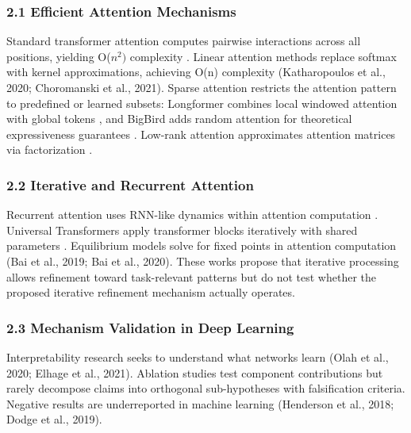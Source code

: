 
\subsubsection{2.1 Efficient Attention Mechanisms}

Standard transformer attention computes pairwise interactions across all positions, yielding O($n^{2})$ complexity \citep{vaswani2017attention}. Linear attention methods replace softmax with kernel approximations, achieving O(n) complexity (Katharopoulos et al., 2020; Choromanski et al., 2021). Sparse attention restricts the attention pattern to predefined or learned subsets: Longformer combines local windowed attention with global tokens \citep{beltagy2020longformer}, and BigBird adds random attention for theoretical expressiveness guarantees \citep{zaheer2020big}. Low-rank attention approximates attention matrices via factorization \citep{wang2020linformer}.

\subsubsection{2.2 Iterative and Recurrent Attention}

Recurrent attention uses RNN-like dynamics within attention computation \citep{graves2016adaptive}. Universal Transformers apply transformer blocks iteratively with shared parameters \citep{dehghani2019universal}. Equilibrium models solve for fixed points in attention computation (Bai et al., 2019; Bai et al., 2020). These works propose that iterative processing allows refinement toward task-relevant patterns but do not test whether the proposed iterative refinement mechanism actually operates.

\subsubsection{2.3 Mechanism Validation in Deep Learning}

Interpretability research seeks to understand what networks learn (Olah et al., 2020; Elhage et al., 2021). Ablation studies test component contributions but rarely decompose claims into orthogonal sub-hypotheses with falsification criteria. Negative results are underreported in machine learning (Henderson et al., 2018; Dodge et al., 2019).

